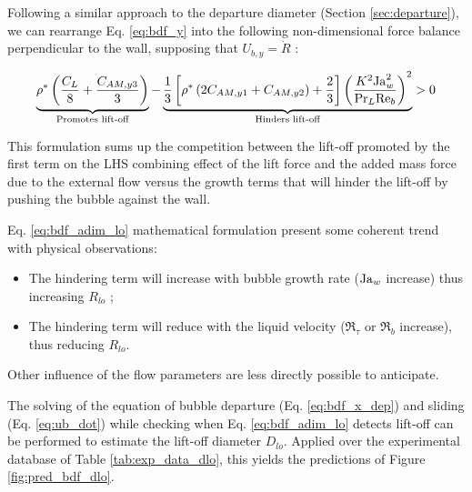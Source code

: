 Following a similar approach to the departure diameter (Section \ref{sec:departure}), we can rearrange Eq. \ref{eq:bdf_y} into the following non-dimensional force balance perpendicular to the wall, supposing that $U_{b,y} = \dot{R}$ :

\begin{align}
\underbrace{ \rho^{*} \left( \frac{C_{L}}{8} + \frac{C_{AM,y3}}{3} \right) }_{\text{Promotes lift-off}} - \underbrace{ \frac{1}{3}\left[ \rho^{*}\left( 2C_{AM,y1} + C_{AM,y2}  \right) + \frac{2}{3}  \right] \left( \frac{K^{2} \mathrm{Ja}_{w}^{2}}{\mathrm{Pr}_{L}\mathrm{Re}_{b}} \right)^{2} }_{\text{Hinders lift-off}} > 0
\label{eq:bdf_adim_lo}
\end{align}

This formulation sums up the competition between the lift-off promoted by the first term on the LHS combining effect of the lift force and the added mass force due to the external flow versus the growth terms that will hinder the lift-off by pushing the bubble against the wall.

\begin{remark*}{}
Eq. \ref{eq:bdf_adim_lo} mathematical formulation present some coherent trend with physical observations:

\begin{itemize}
\item The hindering term will increase with bubble growth rate (\ie $\mathrm{Ja}_{w}$ increase) thus increasing $R_{lo}$ ;
\item The hindering term will reduce with the liquid velocity (\ie $\Re_{\tau}$ or $\Re_{b}$ increase), thus reducing $R_{lo}$.
\end{itemize}

Other influence of the flow parameters are less directly possible to anticipate.
\end{remark*}

The solving of the equation of bubble departure (Eq. \ref{eq:bdf_x_dep}) and sliding (Eq. \ref{eq:ub_dot}) while checking when Eq. \ref{eq:bdf_adim_lo} detects lift-off can be performed to estimate the lift-off diameter $D_{lo}$. Applied over the experimental database of Table \ref{tab:exp_data_dlo}, this yields the predictions of Figure \ref{fig:pred_bdf_dlo}.


